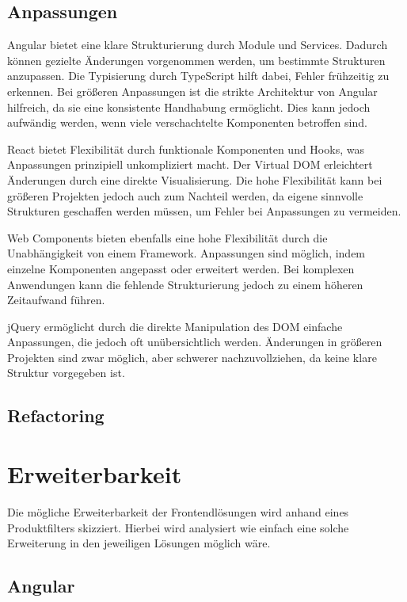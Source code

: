 \documentclass[oneside]{ausarbeitung}
\begin{document}
\subsection{Anpassungen}

Angular bietet eine klare Strukturierung durch Module und Services. Dadurch können gezielte Änderungen vorgenommen werden, um bestimmte Strukturen anzupassen. Die Typisierung durch TypeScript hilft dabei, Fehler frühzeitig zu erkennen. Bei größeren Anpassungen ist die strikte Architektur von Angular hilfreich, da sie eine konsistente Handhabung ermöglicht. Dies kann jedoch aufwändig werden, wenn viele verschachtelte Komponenten betroffen sind.

React bietet Flexibilität durch funktionale Komponenten und Hooks, was Anpassungen prinzipiell unkompliziert macht. Der Virtual DOM erleichtert Änderungen durch eine direkte Visualisierung. Die hohe Flexibilität kann bei größeren Projekten jedoch auch zum Nachteil werden, da eigene sinnvolle Strukturen geschaffen werden müssen, um Fehler bei Anpassungen zu vermeiden.

Web Components bieten ebenfalls eine hohe Flexibilität durch die Unabhängigkeit von einem Framework. Anpassungen sind möglich, indem einzelne Komponenten angepasst oder erweitert werden. Bei komplexen Anwendungen kann die fehlende Strukturierung jedoch zu einem höheren Zeitaufwand führen.

jQuery ermöglicht durch die direkte Manipulation des DOM einfache Anpassungen, die jedoch oft unübersichtlich werden. Änderungen in größeren Projekten sind zwar möglich, aber schwerer nachzuvollziehen, da keine klare Struktur vorgegeben ist.

\subsection{Refactoring}

\section{Erweiterbarkeit}

Die mögliche Erweiterbarkeit der Frontendlösungen wird anhand eines Produktfilters skizziert. Hierbei wird analysiert wie einfach eine solche Erweiterung in den jeweiligen Lösungen möglich wäre. 

\subsection{Angular}
\end{document}
